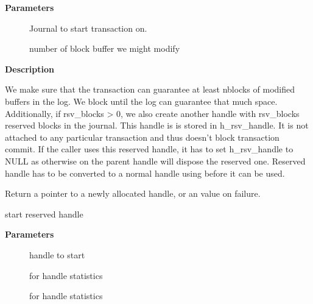 \documentclass[a4paper,8pt,english]{sphinxmanual}
\begin{document}
\textbf{Parameters}
\begin{description}
\item[{}] \leavevmode
Journal to start transaction on.

\item[{}] \leavevmode
number of block buffer we might modify

\end{description}

\textbf{Description}

We make sure that the transaction can guarantee at least nblocks of
modified buffers in the log.  We block until the log can guarantee
that much space. Additionally, if rsv\_blocks \textgreater{} 0, we also create another
handle with rsv\_blocks reserved blocks in the journal. This handle is
is stored in h\_rsv\_handle. It is not attached to any particular transaction
and thus doesn't block transaction commit. If the caller uses this reserved
handle, it has to set h\_rsv\_handle to NULL as otherwise {\hyperref[filesystems/index:c.jbd2_journal_stop]{\emph{}}}
on the parent handle will dispose the reserved one. Reserved handle has to
be converted to a normal handle using {\hyperref[filesystems/index:c.jbd2_journal_start_reserved]{\emph{}}} before
it can be used.

Return a pointer to a newly allocated handle, or an  value
on failure.

\begin{fulllineitems}
\label{filesystems/index:c.jbd2_journal_start_reserved}
start reserved handle

\end{fulllineitems}


\textbf{Parameters}
\begin{description}
\item[{}] \leavevmode
handle to start

\item[{}] \leavevmode
for handle statistics

\item[{}] \leavevmode
for handle statistics

\end{description}
\end{document}
